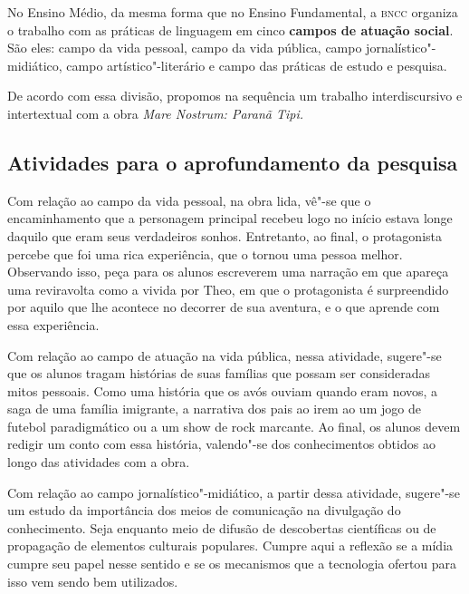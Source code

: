 \documentclass[12pt]{extarticle}
\begin{document}




No Ensino Médio, da mesma forma que no Ensino Fundamental, a \textsc{bncc}
organiza o trabalho com as práticas de linguagem em cinco \textbf{campos
de atuação social}. São eles: campo da vida pessoal, campo da vida
pública, campo jornalístico"-midiático, campo artístico"-literário e campo
das práticas de estudo e pesquisa.

De acordo com essa divisão, propomos na sequência um trabalho
interdiscursivo e intertextual com a obra \emph{Mare Nostrum: Paranã
Tipi.}

\subsection{Atividades para o aprofundamento da pesquisa}



Com relação ao campo da vida pessoal, na obra lida, vê"-se que o encaminhamento que a personagem principal
  recebeu logo no início estava longe daquilo que eram seus verdadeiros
  sonhos. Entretanto, ao final, o protagonista percebe que foi uma rica
  experiência, que o tornou uma pessoa melhor. Observando isso, peça para os alunos
  escreverem uma narração em que apareça uma reviravolta como a vivida
  por Theo, em que o protagonista é surpreendido por aquilo que lhe
  acontece no decorrer de sua aventura, e o que aprende com essa
  experiência.

Com relação ao campo de atuação na vida pública, 
  nessa atividade, sugere"-se que os alunos tragam histórias de suas
  famílias que possam ser consideradas mitos pessoais. Como uma história
  que os avós ouviam quando eram novos, a saga de uma família imigrante,
  a narrativa dos pais ao irem ao um jogo de futebol paradigmático ou a
  um show de rock marcante. Ao final, os alunos devem redigir um conto
  com essa história, valendo"-se dos conhecimentos obtidos ao longo das
  atividades com a obra.

Com relação ao campo jornalístico"-midiático, a partir dessa atividade, 
sugere"-se um estudo da importância dos meios
  de comunicação na divulgação do conhecimento. Seja enquanto meio de
  difusão de descobertas científicas ou de propagação de elementos
  culturais populares. Cumpre aqui a reflexão se a mídia cumpre seu
  papel nesse sentido e se os mecanismos que a tecnologia ofertou para
  isso vem sendo bem utilizados.
\end{document}
